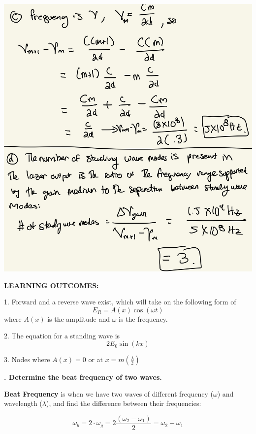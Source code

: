 \documentclass[10pt]{article}
\newcounter{counter}
\newcommand*{\question}[1]{
            \textbf{\thecounter. #1} \hfill
            \addtocounter{counter}{1}
            
            \newblock

            }
\begin{document}
\begin{center}
    \includegraphics*[scale = .2]{imgs/cavity-example-cont.jpeg}
\end{center}
\textbf{LEARNING OUTCOMES:} \\ 
\fbox
{
    \begin{minipage}{\linewidth}
    1. Forward and a reverse wave exist, which will take on the following form of
    \[E_R = A(x)\cos(\omega t)\]
    where $A(x)$ is the amplitude and $\omega$ is the frequency.

    \newblock

    2. The equation for a standing wave is 
    \[2E_0 \sin(kx)\]

    3. Nodes where $A(x) = 0$ or at $x = m (\frac{\lambda}{2})$
    \end{minipage}
}

\newpage

\question{Determine the beat frequency of two waves.}

\textbf{Beat Frequency} is when we have two waves of different frequency ($\omega$) and wavelength ($\lambda$), and find the difference between their frequencies:

\[\omega_b = 2 \cdot \omega_g = 2 \frac{(\omega_2 - \omega_1)}{2} = \omega_2 - \omega_1\]
\end{document}
